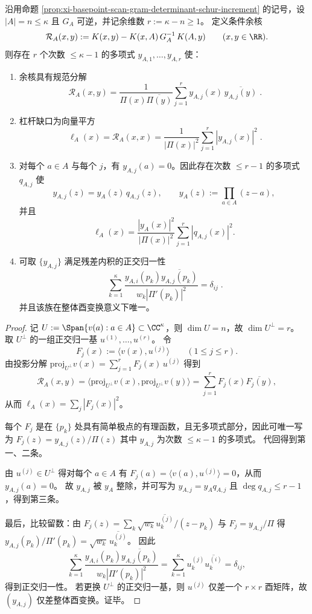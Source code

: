 \begin{theorem}\label{thm:xi-basepoint-scan-residual-kernel-polynomial-frame}
沿用命题 \ref{prop:xi-basepoint-scan-gram-determinant-schur-increment} 的记号，设 \(|A|=n\le\kappa\) 且 \(G_A\) 可逆，并记余维数 \(r:=\kappa-n\ge 1\)。
定义条件余核
\[
\mathcal{R}_A(x,y):=K(x,y)-K(x,A)\,G_A^{-1}\,K(A,y)\qquad(x,y\in\RR).
\]
则存在 \(r\) 个次数 \(\le \kappa-1\) 的多项式 \(y_{A,1},\dots,y_{A,r}\) 使：
\begin{enumerate}
  \item 余核具有规范分解
  \[
  \boxed{\;
  \mathcal{R}_A(x,y)=\frac{1}{\Pi(x)\overline{\Pi(y)}}\sum_{j=1}^{r} y_{A,j}(x)\,\overline{y_{A,j}(y)}\; }.
  \]
  \item 杠杆缺口为向量平方
  \[
  \boxed{\;\ell_A(x)=\mathcal{R}_A(x,x)=\frac{1}{|\Pi(x)|^2}\sum_{j=1}^{r}|y_{A,j}(x)|^2\; }.
  \]
  \item 对每个 \(a\in A\) 与每个 \(j\)，有 \(y_{A,j}(a)=0\)。因此存在次数 \(\le r-1\) 的多项式 \(q_{A,j}\) 使
  \[
  y_{A,j}(z)=y_A(z)\,q_{A,j}(z),
  \qquad
  y_A(z):=\prod_{a\in A}(z-a),
  \]
  并且
  \[
  \ell_A(x)=\frac{|y_A(x)|^2}{|\Pi(x)|^2}\sum_{j=1}^{r}|q_{A,j}(x)|^2.
  \]
  \item 可取 \(\{y_{A,j}\}\) 满足残差内积的正交归一性
  \[
  \boxed{\;
  \sum_{k=1}^{\kappa}\frac{y_{A,i}(p_k)\overline{y_{A,j}(p_k)}}{w_k|\Pi'(p_k)|^2}=\delta_{ij}\; }.
  \]
  并且该族在整体酉变换意义下唯一。
\end{enumerate}
\end{theorem}
\begin{proof}
记 \(U:=\Span\{v(a):a\in A\}\subset\CC^\kappa\)，则 \(\dim U=n\)，故 \(\dim U^\perp=r\)。
取 \(U^\perp\) 的一组正交归一基 \(u^{(1)},\dots,u^{(r)}\)。
令
\[
F_j(x):=\langle v(x),u^{(j)}\rangle\qquad(1\le j\le r).
\]
由投影分解
\(
\mathrm{proj}_{U^\perp}v(x)=\sum_{j=1}^r F_j(x)\,u^{(j)}
\)
得到
\[
\mathcal{R}_A(x,y)=\langle \mathrm{proj}_{U^\perp}v(x),\mathrm{proj}_{U^\perp}v(y)\rangle=\sum_{j=1}^r F_j(x)\overline{F_j(y)},
\]
从而 \(\ell_A(x)=\sum_j|F_j(x)|^2\)。
\par
每个 \(F_j\) 是在 \(\{p_k\}\) 处具有简单极点的有理函数，且无多项式部分，因此可唯一写为
\(
F_j(z)=y_{A,j}(z)/\Pi(z)
\)
其中 \(y_{A,j}\) 为次数 \(\le \kappa-1\) 的多项式。
代回得到第一、二条。
\par
由 \(u^{(j)}\in U^\perp\) 得对每个 \(a\in A\) 有 \(F_j(a)=\langle v(a),u^{(j)}\rangle=0\)，从而 \(y_{A,j}(a)=0\)。
故 \(y_{A,j}\) 被 \(y_A\) 整除，并可写为 \(y_{A,j}=y_A q_{A,j}\) 且 \(\deg q_{A,j}\le r-1\)，得到第三条。
\par
最后，比较留数：由 \(F_j(z)=\sum_k \sqrt{w_k}\overline{u^{(j)}_k}/(z-p_k)\) 与 \(F_j=y_{A,j}/\Pi\) 得
\(
y_{A,j}(p_k)/\Pi'(p_k)=\sqrt{w_k}\,\overline{u^{(j)}_k}
\)。
因此
\[
\sum_{k=1}^{\kappa}\frac{y_{A,i}(p_k)\overline{y_{A,j}(p_k)}}{w_k|\Pi'(p_k)|^2}
=
\sum_{k=1}^{\kappa}u^{(j)}_k\overline{u^{(i)}_k}
=\delta_{ij},
\]
得到正交归一性。
若更换 \(U^\perp\) 的正交归一基，则 \(u^{(j)}\) 仅差一个 \(r\times r\) 酉矩阵，故 \((y_{A,j})\) 仅差整体酉变换。证毕。
\end{proof}

